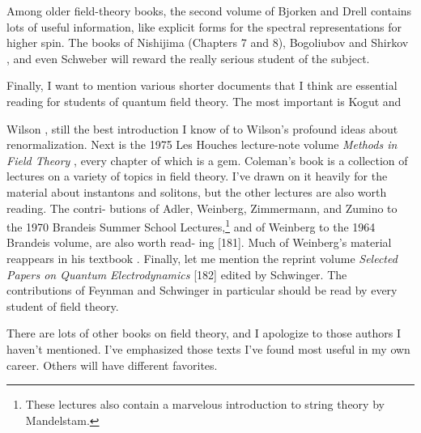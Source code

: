 Among older field-theory books, the second volume of Bjorken and Drell \cite{banks-ref-176}
contains lots of useful information, like explicit forms for the spectral representations
for higher spin. The books of Nishijima \cite{banks-ref-177} (Chapters 7 and 8), Bogoliubov and
Shirkov \cite{banks-ref-178}, and even Schweber \cite{banks-ref-179} will reward the really serious student of the
subject.

Finally, I want to mention various shorter documents that I think are essential
reading for students of quantum field theory. The most important is Kogut and

Wilson \cite{banks-ref-126}, still the best introduction I know of to Wilson's profound ideas about
renormalization. Next is the 1975 Les Houches lecture-note volume \emph{Methods in Field
Theory} \cite{banks-ref-180}, every chapter of which is a gem. Coleman's book \cite{banks-ref-138} is a collection of
lectures on a variety of topics in field theory. I've drawn on it heavily for the material
about instantons and solitons, but the other lectures are also worth reading. The contri-
butions of Adler, Weinberg, Zimmermann, and Zumino to the 1970 Brandeis Summer
School Lectures,\footnote[1]{These lectures also contain a marvelous introduction to string theory by Mandelstam.} and of Weinberg to the 1964 Brandeis volume, are also worth read-
ing \textup{[181]}. Much of Weinberg's material reappears in his textbook \cite{banks-ref-131}. Finally, let me
mention the reprint volume \emph{Selected Papers on Quantum Electrodynamics} \textup{[182]} edited
by Schwinger. The contributions of Feynman and Schwinger in particular should be
read by every student of field theory.

There are lots of other books on field theory, and I apologize to those authors
I haven't mentioned. I've emphasized those texts I've found most useful in my own
career. Others will have different favorites.
